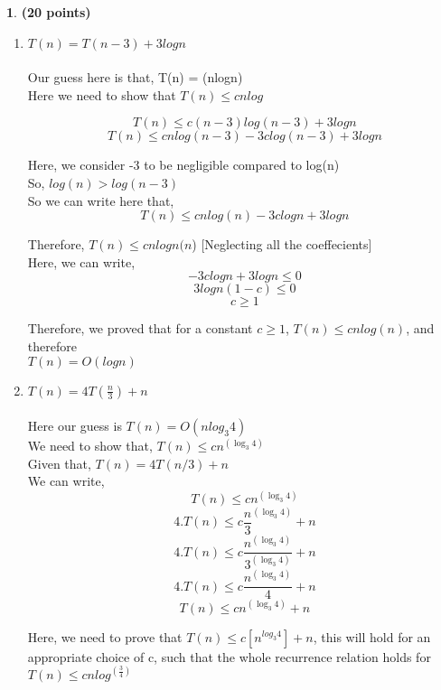 \documentclass[11pt]{article}
\theoremstyle{definition}
\newtheorem{prob}{}
\newcommand{\solution}{\medskip\noindent{\color{DarkBlue}\textbf{Solution:}}}
\begin{document}
 
\begin{prob} \textbf{(20 points)}
\end{prob}
\begin{enumerate}
    \item $T(n) = T(n-3) + 3logn$ \\
    \solution \\
    Our guess here is that, T(n) = (nlogn) \\

    Here we need to show that $T(n) \leq cnlog$

    \[ T(n) \leq c(n-3)log(n-3) + 3logn \]
    \[ T(n) \leq cnlog(n-3) -3clog(n-3) + 3logn \] 

    Here, we consider -3 to be negligible compared to log(n) \\

    So, $log(n) > log(n-3)$ \\

    So we can write here that, \\

    \[ T(n) \leq cnlog(n) -3clogn + 3logn \]

    Therefore, $T(n) \leq cnlogn(n$) [Neglecting all the coeffecients] \\

    Here, we can write, 
    \[ -3clogn + 3logn \leq 0 \]
    \[ 3logn(1-c) \leq 0 \]
    \[ c\geq 1\]

    Therefore, we proved that for a constant $c \geq 1$, $T(n) \leq cnlog(n)$, and therefore\\
    $T(n) = O(logn)$

    \item $T(n) = 4T(\frac{n}{3}) + n$ \\
    \solution \\
    Here our guess is $T(n) = O(nlog_3 4)$ \\

    We need to show that, $T(n) \leq cn^{(\log_{3} 4)}$ \\

    Given that, $T(n) = 4T(n/3) + n$ \\

    We can write,
    \[ T(n) \leq cn^{(\log_{3} 4)} \]
    \[ 4.T(n) \leq c\frac{n}{3}^{(\log_{3} 4)} +n\]
    \[ 4.T(n) \leq c\frac{n^{(\log_{3} 4)}}{3^{(\log_{3} 4)}} +n\]
    \[ 4.T(n) \leq c\frac{n^{(\log_{3} 4)}}{4} +n\]
    \[ T(n) \leq cn^{(\log_{3} 4)} +n\]

    Here, we need to prove that $ T(n) \leq c[n^{log_3 4}] + n$, this will hold for an appropriate choice of c, such that the whole recurrence
    relation holds for $T(n) \leq cnlog^(\frac{3}{4})$


\end{enumerate}
\end{document}
